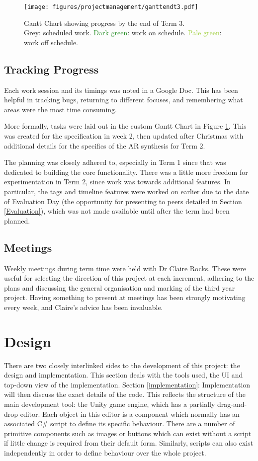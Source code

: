 \documentclass[12pt, a4paper]{article}
\newcommand{\light}[1]{\textcolor{mygrey}{#1}}
\begin{document}
\newpage

\begin{figure}[H]
    \texttt{[image: figures/projectmanagement/ganttendt3.pdf]}
        \caption{Gantt Chart showing progress by the end of Term 3. \\ \light{Grey}: scheduled work. \textcolor{ForestGreen}{Dark green}: work on schedule. \textcolor{YellowGreen}{Pale green}: work off schedule.}
        \label{fig:gantt}
\end{figure}

\subsection{Tracking Progress}
Each work session and its timings was noted in a Google Doc. This has been helpful in tracking bugs, returning to different focuses, and remembering what areas were the most time consuming.

More formally, tasks were laid out in the custom Gantt Chart in Figure \ref{fig:gantt}. This was created for the specification in week 2, then updated after Christmas with additional details for the specifics of the AR synthesis for Term 2. 

The planning was closely adhered to, especially in Term 1 since that was dedicated to building the core functionality. There was a little more freedom for experimentation in Term 2, since work was towards additional features. In particular, the tags and timeline features were worked on earlier due to the date of Evaluation Day (the opportunity for presenting to peers detailed in Section \ref{Evaluation}), which was not made available until after the term had been planned.

\subsection{Meetings}
Weekly meetings during term time were held with Dr Claire Rocks. These were useful for selecting the direction of this project at each increment, adhering to the plans and discussing the general organisation and marking of the third year project. Having something to present at meetings has been strongly motivating every week, and Claire's advice has been invaluable.

\newpage
\section{Design}
There are two closely interlinked sides to the development of this project: the design and implementation. This section deals with the tools used, the UI and top-down view of the implementation. Section \ref{implementation}: Implementation will then discuss the exact details of the code. This reflects the structure of the main development tool: the Unity game engine, which has a partially drag-and-drop editor. Each object in this editor is a component which normally has an associated C\# script to define its specific behaviour. There are a number of primitive components such as images or buttons which can exist without a script if little change is required from their default form. Similarly, scripts can also exist independently in order to define behaviour over the whole project.
\end{document}
